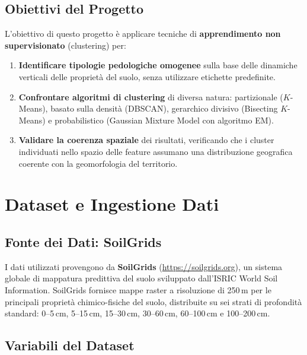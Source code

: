 \documentclass[a4paper,12pt]{article}
\newcommand{\kmeans}{$K$\nobreakdash-Means}
\begin{document}
\subsection{Obiettivi del Progetto}

L'obiettivo di questo progetto è applicare tecniche di
\textbf{apprendimento non supervisionato} (clustering) per:

\begin{enumerate}
    \item \textbf{Identificare tipologie pedologiche omogenee} sulla
    base delle dinamiche verticali delle proprietà del suolo, senza
    utilizzare etichette predefinite.

    \item \textbf{Confrontare algoritmi di clustering} di diversa
    natura: partizionale (\kmeans{}), basato sulla densità (DBSCAN),
    gerarchico divisivo (Bisecting \kmeans{}) e probabilistico
    (Gaussian Mixture Model con algoritmo EM).

    \item \textbf{Validare la coerenza spaziale} dei risultati,
    verificando che i cluster individuati nello spazio delle feature
    assumano una distribuzione geografica coerente con la geomorfologia
    del territorio.
\end{enumerate}

\section{Dataset e Ingestione Dati}
\label{sec:dati}

\subsection{Fonte dei Dati: SoilGrids}

I dati utilizzati provengono da \textbf{SoilGrids}
(\url{https://soilgrids.org}), un sistema globale di mappatura
predittiva del suolo sviluppato dall'ISRIC World Soil Information.
SoilGrids fornisce mappe raster a risoluzione di 250\,m per le
principali proprietà chimico-fisiche del suolo, distribuite su sei
strati di profondità standard: 0--5\,cm, 5--15\,cm, 15--30\,cm,
30--60\,cm, 60--100\,cm e 100--200\,cm.

\subsection{Variabili del Dataset}
\end{document}
